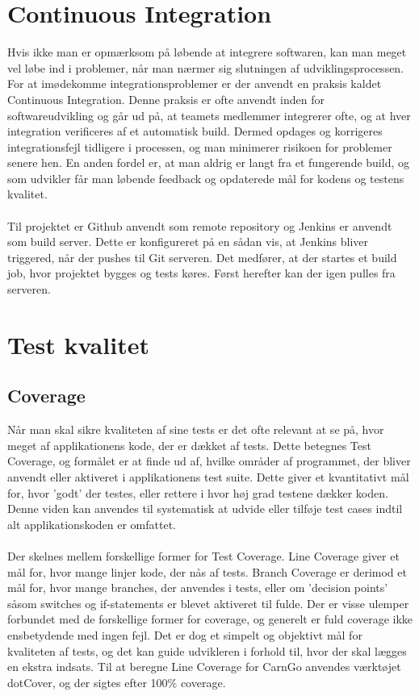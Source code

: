 \documentclass[a4paper,12pt,fleqn,oneside]{article}
\begin{document}
\section{Continuous Integration}
Hvis ikke man er opmærksom på løbende at integrere softwaren, kan man meget vel løbe ind i problemer, når man nærmer sig slutningen af udviklingsprocessen. For at imødekomme integrationsproblemer er der anvendt en praksis kaldet Continuous Integration. Denne praksis er ofte anvendt inden for softwareudvikling og går ud på, at teamets medlemmer integrerer ofte, og at hver integration verificeres af et automatisk build. Dermed opdages og korrigeres integrationsfejl tidligere i processen, og man minimerer risikoen for problemer senere hen. En anden fordel er, at man aldrig er langt fra et fungerende build, og som udvikler får man løbende feedback og opdaterede mål for kodens og testens kvalitet. \\\\Til projektet er Github anvendt som remote repository og Jenkins er anvendt som build server. Dette er konfigureret på en sådan vis, at Jenkins bliver triggered, når der pushes til Git serveren. Det medfører, at der startes et build job, hvor projektet bygges og tests køres. Først herefter kan der igen pulles fra serveren.

\section{Test kvalitet}

\subsection{Coverage}
Når man skal sikre kvaliteten af sine tests er det ofte relevant at se på, hvor meget af applikationens kode, der er dækket af tests. Dette betegnes Test Coverage, og formålet er at finde ud af, hvilke områder af programmet, der bliver anvendt eller aktiveret i applikationens test suite. Dette giver et kvantitativt mål for, hvor 'godt' der testes, eller rettere i hvor høj grad testene dækker koden. Denne viden kan anvendes til systematisk at udvide eller tilføje test cases indtil alt applikationskoden er omfattet. \\\\Der skelnes mellem forskellige former for Test Coverage. Line Coverage giver et mål for, hvor mange linjer kode, der nås af tests. Branch Coverage er derimod et mål for, hvor mange branches, der anvendes i tests, eller om 'decision points' såsom switches og if-statements er blevet aktiveret til fulde. Der er visse ulemper forbundet med de
forskellige former for coverage, og generelt er fuld coverage ikke ensbetydende med ingen fejl. Det er dog et simpelt og objektivt mål for kvaliteten af tests, og det kan guide udvikleren i forhold til, hvor der skal lægges en ekstra indsats. Til at beregne Line Coverage for CarnGo anvendes værktøjet dotCover, og der sigtes efter 100\% coverage.
\end{document}

